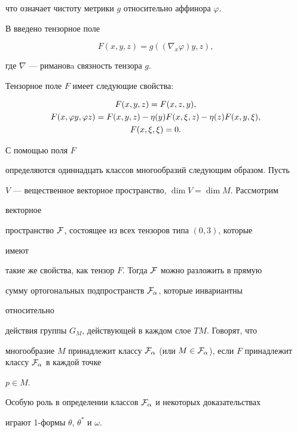 что означает чистоту метрики $g$ относительно аффинора $\varphi$.


 


В \cite{1} введено тензорное поле 


$$ 


F(x,y,z)=g((\nabla_x\varphi)y,z), 


$$ 


где $\nabla$ --- римановa связность тензора $g$.


Тензорное поле $F$ имеет следующие свойства: 


\begin{gather} 


F(x,y,z)=F(x,z,y),\notag \\ 


F(x,\varphi y,\varphi z)=F(x,y,z)-\eta(y)F(x,\xi,z)- 


\eta(z)F(x,y,\xi), \\ 


F(x,\xi,\xi)=0.\notag 


\end{gather} 


С помощью поля $F$ 


определяются одиннадцать классов многообразий следующим образом. Пусть 


$V$ --- вещественное векторное пространство, $\dim V=\dim M$. Рассмотрим 


векторное 


пространство $\cal F$, состоящее из всех тензоров типа $(0,3)$, которые 


имеют 


такие же свойства, как тензор $F$. Тогда $\cal F$ можно разложить в прямую 


сумму ортогональных подпространств $\cal F_\alpha$, которые инвариантны 


относительно 


действия группы $G_M$, действующей в каждом слое $TM$. Говорят, что 


многообразие $M$ принадлежит классу $\cal F_\alpha$ (или $M\in\cal 


F_\alpha$), если $F$ принадлежит классу $\cal F_\alpha$ в каждой точке 


$p\in M$. 





Особую роль в определении классов $\cal F_\alpha$ и некоторых доказательствах


играют 1-формы $\theta$, $\theta^*$ и $\omega$.


